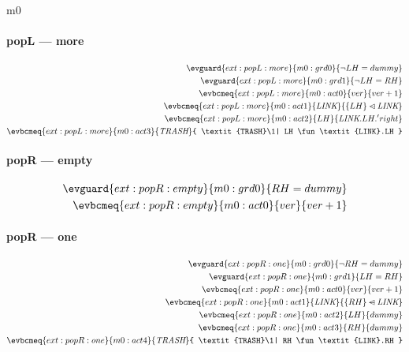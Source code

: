 \documentclass[12pt]{amsart}
\newcommand{\link}{\textit{LINK}}
\newcommand{\trash}{\textit{TRASH}}
\begin{document}
\begin{machine}{m0}
\paragraph{popL --- more}

\begin{align*}
  \evguard{ext:popL:more}
      {m0:grd0}{\neg LH = dummy} \\
  \evguard{ext:popL:more}
      {m0:grd1}{\neg LH = RH} \\
  \evbcmeq{ext:popL:more}{m0:act0}
      {ver}{ver + 1} \\
  \evbcmeq{ext:popL:more}{m0:act1}
      {\link}{ \{LH\} \domsub \link } \\
  \evbcmeq{ext:popL:more}{m0:act2}
      {LH}{ \link.LH.'right } \\
  \evbcmeq{ext:popL:more}{m0:act3}
      {\trash}{ \trash \1| LH \fun \link.LH } \\
\end{align*}

\paragraph{popR --- empty}

\begin{align*}
  \evguard{ext:popR:empty}
      {m0:grd0}{RH = dummy} \\
  \evbcmeq{ext:popR:empty}{m0:act0}
      {ver}{ver + 1}
\end{align*}

\paragraph{popR --- one}

\begin{align*}
  \evguard{ext:popR:one}
      {m0:grd0}{\neg RH = dummy} \\
  \evguard{ext:popR:one}
      {m0:grd1}{LH = RH} \\
  \evbcmeq{ext:popR:one}{m0:act0}
      {ver}{ver + 1} \\
  \evbcmeq{ext:popR:one}{m0:act1}
      {\link}{ \{RH\} \domsub \link } \\
  \evbcmeq{ext:popR:one}{m0:act2}
      {LH}{ dummy } \\
  \evbcmeq{ext:popR:one}{m0:act3}
      {RH}{ dummy } \\
  \evbcmeq{ext:popR:one}{m0:act4}
      {\trash}{ \trash \1| RH \fun \link.RH } \\
\end{align*}


\end{machine}
\end{document}
